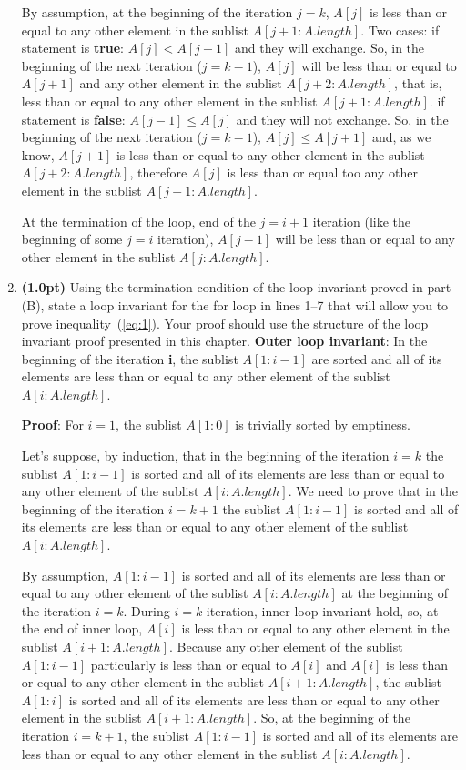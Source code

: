 \documentclass{article}
\begin{document}
\begin{enumerate}[label=\Alph*]
  By assumption, at the beginning of the iteration $j = k$, $A[j]$ is less than or equal to any other element in the sublist $A[j + 1:A.length]$. Two cases:
  \subitem if statement is \textbf{true}: $A[j] < A[j - 1]$ and they will exchange. So, in the beginning of the next iteration ($j = k - 1$), $A[j]$ will be less than or equal to $A[j + 1]$ and any other element in the sublist $A[j + 2:A.length]$, that is, less than or equal to any other element in the sublist $A[j + 1:A.length]$.
  \subitem if statement is \textbf{false}: $A[j - 1] \le A[j]$ and they will not exchange. So, in the beginning of the next iteration ($j = k - 1$), $A[j] \le A[j + 1]$ and, as we know, $A[j + 1]$ is less than or equal to any other element in the sublist $A[j + 2:A.length]$, therefore $A[j]$ is less than or equal too any other element in the sublist $A[j + 1:A.length]$.
  
  At the termination of the loop, end of the $j = i + 1$ iteration (like the beginning of some $j = i$ iteration), $A[j - 1]$ will be less than or equal to any other element in the sublist $A[j:A.length]$.
  \bigbreak
  \item \textbf{(1.0pt)} Using the termination condition of the loop invariant proved in part (B), state a loop invariant for the for loop in lines 1–7 that will allow you to prove inequality~(\ref{eq:1}). Your proof should use the structure of the loop invariant proof presented in this chapter.
  \bigbreak
  \textbf{Outer loop invariant}: In the beginning of the iteration \textbf{i}, the sublist $A[1:i - 1]$ are sorted and all of its elements are less than or equal to any other element of the sublist $A[i:A.length]$.
  
  \textbf{Proof}: For $i = 1$, the sublist $A[1:0]$ is trivially sorted by emptiness.
  
  Let's suppose, by induction, that in the beginning of the iteration $i = k$ the sublist $A[1:i - 1]$ is sorted and all of its elements are less than or equal to any other element of the sublist $A[i:A.length]$. We need to prove that in the beginning of the iteration $i = k + 1$ the sublist $A[1:i - 1]$ is sorted and all of its elements are less than or equal to any other element of the sublist $A[i:A.length]$.
  
  By assumption, $A[1:i - 1]$ is sorted and all of its elements are less than or equal to any other element of the sublist $A[i:A.length]$ at the beginning of the iteration $i = k$. During $i = k$ iteration, inner loop invariant hold, so, at the end of inner loop, $A[i]$ is less than or equal to any other element in the sublist $A[i + 1:A.length]$. Because any other element of the sublist $A[1:i - 1]$ particularly is less than or equal to $A[i]$ and $A[i]$ is less than or equal to any other element in the sublist $A[i + 1:A.length]$, the sublist $A[1:i]$ is sorted and all of its elements are less than or equal to any other element in the sublist $A[i + 1:A.length]$. So, at the beginning of the iteration $i = k + 1$, the sublist $A[1:i - 1]$ is sorted and all of its elements are less than or equal to any other element in the sublist $A[i:A.length]$.
  

\end{enumerate}
\end{document}
